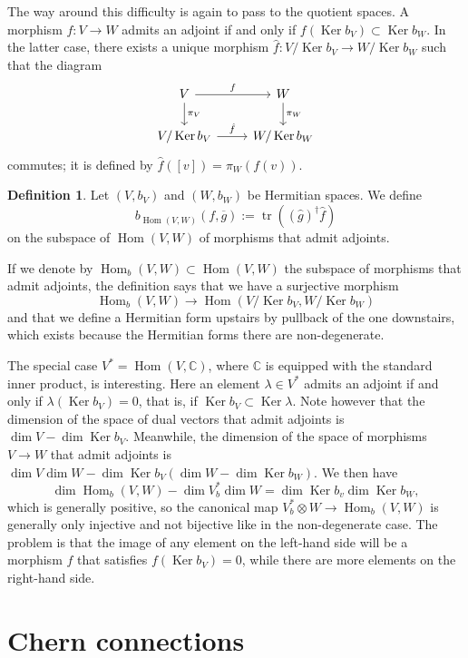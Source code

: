 \documentclass[10pt,a4paper]{amsart}
\theoremstyle{definition}
\newtheorem{defi}[theo]{Definition}
\newcommand{\kk}[1]{\mathbb{#1}}
\def\ov#1{\overline{#1}}
\DeclareMathOperator{\Ker}{Ker}
\DeclareMathOperator{\Hom}{Hom}
\DeclareMathOperator{\tr}{tr}
\begin{document}
The way around this difficulty is again to pass to the quotient spaces. A morphism $f : V \to W$ admits an adjoint if and only if $f(\Ker b_V) \subset \Ker b_W$. In the latter case, there exists a unique morphism $\hat f : V / \Ker b_V \to W / \Ker b_W$ such that the diagram
\[
\begin{tikzcd}
V \ar[d,"\pi_V"] \ar[r,"f"] & W \ar[d,"\pi_W"]
\\
V / \Ker b_V \ar[r,"\hat f"] & W / \Ker b_W
\end{tikzcd}
\]
commutes; it is defined by $\hat f([v]) = \pi_W(f(v))$.


\begin{defi}
Let $(V,b_V)$ and $(W,b_W)$ be Hermitian spaces. We define
\[
b_{\Hom(V,W)}(f, \ov g) := \tr((\hat g)^\dagger \hat f)
\]
on the subspace of $\Hom(V,W)$ of morphisms that admit adjoints.
\end{defi}

If we denote by $\Hom_b(V,W) \subset \Hom(V,W)$ the subspace of morphisms that admit adjoints, the definition says that we have a surjective morphism
\[
\Hom_b(V,W) \to \Hom(V/\Ker b_V, W/\Ker b_W)
\]
and that we define a Hermitian form upstairs by pullback of the one downstairs, which exists because the Hermitian forms there are non-degenerate.

The special case $V^* = \Hom(V, \kk C)$, where $\kk C$ is equipped with the
standard inner product, is interesting.
Here an element $\lambda \in V^*$ admits an adjoint if and only if $\lambda(\Ker b_V)
= 0$, that is, if $\Ker b_V \subset \Ker \lambda$.
Note however that the dimension of the space of dual vectors that admit adjoints
is $\dim V - \dim \Ker b_V$.
Meanwhile, the dimension of the space of morphisms $V \to W$ that admit adjoints
is $\dim V \dim W - \dim \Ker b_V (\dim W - \dim \Ker b_W)$.
We then have
$$
\dim \Hom_b(V, W)
- \dim V^*_b \dim W
= \dim \Ker b_v \dim \Ker b_W,
$$
which is generally positive, so the canonical map $V_b^* \otimes W \to \Hom_b(V,
W)$ is generally only injective and not bijective like in the non-degenerate
case.
The problem is that the image of any element on the left-hand side will be a
morphism $f$ that satisfies $f(\Ker b_V) = 0$, while there are more elements on
the right-hand side.


\section{Chern connections}
\label{sec:degenerate-chern-connections}
\end{document}
